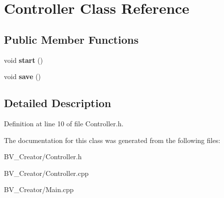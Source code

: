 \hypertarget{class_controller}{
\section{Controller Class Reference}
\label{class_controller}
}
\subsection*{Public Member Functions}
\begin{DoxyCompactItemize}
\item 
\hypertarget{class_controller_ad535ad74055e645b7f44b7feeb4e82a8}{
void {\bfseries start} ()}
\label{class_controller_ad535ad74055e645b7f44b7feeb4e82a8}

\item 
\hypertarget{class_controller_ae0f9dec048daf5dfdd42b82072ac6185}{
void {\bfseries save} ()}
\label{class_controller_ae0f9dec048daf5dfdd42b82072ac6185}

\end{DoxyCompactItemize}


\subsection{Detailed Description}


Definition at line 10 of file Controller.h.

The documentation for this class was generated from the following files:\begin{DoxyCompactItemize}
\item 
BV\_\-Creator/Controller.h\item 
BV\_\-Creator/Controller.cpp\item 
BV\_\-Creator/Main.cpp\end{DoxyCompactItemize}

